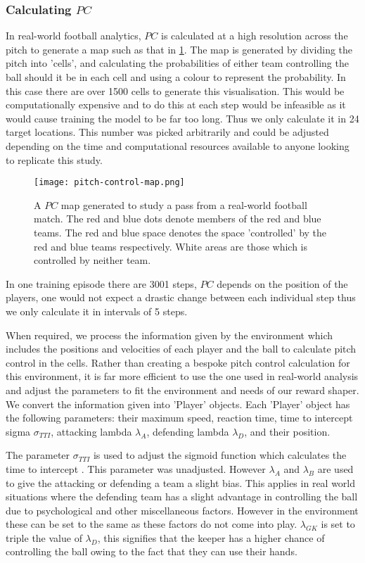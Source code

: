 \documentclass[11pt]{article}
\begin{document}
\subsubsection{Calculating $PC$}
In real-world football analytics, $PC$ is calculated at a high resolution across the pitch to generate a map such as that in \ref{fig:pc-map}. The map is generated by dividing the pitch into 'cells', and calculating the probabilities of either team controlling the ball should it be in each cell and using a colour to represent the probability. In this case there are over 1500 cells to generate this visualisation. This would be computationally expensive and to do this at each step would be infeasible as it would cause training the model to be far too long. Thus we only calculate it in 24 target locations. This number was picked arbitrarily and could be adjusted depending on the time and computational resources available to anyone looking to replicate this study.

\begin{figure}[!h]
    \centering
    \texttt{[image: pitch-control-map.png]}
    \caption{A $PC$ map generated to study a pass from a real-world football match. The red and blue dots denote members of the red and blue teams. The red and blue space denotes the space 'controlled' by the red and blue teams respectively. White areas are those which is controlled by neither team.}
    \label{fig:pc-map}
\end{figure}

In one training episode there are 3001 steps, $PC$ depends on the position of the players, one would not expect a drastic change between each individual step thus we only calculate it in intervals of 5 steps.

When required, we process the information given by the environment which includes the positions and velocities of each player and the ball to calculate pitch control in the cells.  Rather than creating a bespoke pitch control calculation for this environment, it is far more efficient to use the one used in real-world analysis and adjust the parameters to fit the environment and needs of our reward shaper.
We convert the information given into 'Player' objects. Each 'Player' object has the following parameters: their maximum speed, reaction time, time to intercept sigma $\sigma_{TTI}$, attacking lambda $\lambda_A$, defending lambda $\lambda_D$, and their position.

The parameter $\sigma_{TTI}$ is used to adjust the sigmoid function which calculates the time to intercept \cite{Spearman2018}. This parameter was unadjusted. However $\lambda_A$ and $\lambda_B$ are used to give the attacking or defending a team a slight bias. This applies in real world situations where the defending team has a slight advantage in controlling the ball due to psychological and other miscellaneous factors. However in the environment these can be set to the same as these factors do not come into play. $\lambda_{GK}$ is set to triple the value of $\lambda_D$, this signifies that the keeper has a higher chance of controlling the ball owing to the fact that they can use their hands.
\end{document}
